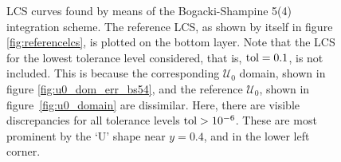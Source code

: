 \begin{figure}[htpb]
    \centering
    
    \caption[LCS curves found by means of the Bogacki-Shampine 5(4) integration
    scheme]{
        LCS curves found by means of the Bogacki-Shampine 5(4) integration
        scheme. The reference LCS, as shown by itself in figure
        \ref{fig:referencelcs}, is plotted on the bottom layer. Note that
        the LCS for the lowest tolerance level considered, that is,
        $\textnormal{tol}=0.1$, is not included. This is because the
        corresponding $\mathcal{U}_{0}$ domain, shown in figure
        \ref{fig:u0_dom_err_bs54}, and the reference $\mathcal{U}_{0}$, shown
        in figure~\ref{fig:u0_domain} are dissimilar. Here, there are visible
        discrepancies for all tolerance levels $\textnormal{tol}>10^{-6}$.
        These are most prominent by the `U' shape near $y=0.4$, and in the
        lower left corner.}
    \label{fig:lcs_rkbs54}
\end{figure}
